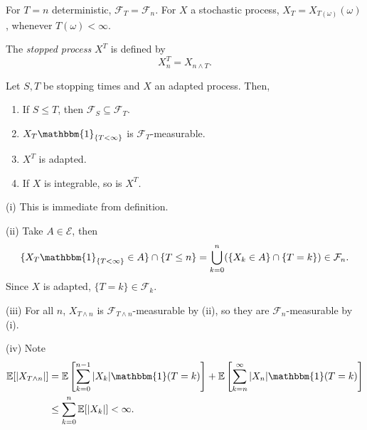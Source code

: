\documentclass[12pt]{article}
\begin{document}
For $T = n$ deterministic, $\mathcal{F}_T = \mathcal{F}_n$. For $X$ a stochastic process, $X_T = X_{T(\omega)}(\omega)$, whenever $T(\omega) < \infty$.

The \emph{stopped process} $X^T$ is defined by
\[
X^T_n = X_{ n \wedge T}.
\]

\begin{proposition}
	Let $S, T$ be stopping times and $X$ an adapted process. Then,
	\begin{enumerate}[\normalfont(i)]
		\item If $S \leq T$, then $\mathcal{F}_S \subseteq \mathcal{F}_T$.
		\item $X_T \mathbbm{1}_{\{T < \infty\}}$ is $\mathcal{F}_T$-measurable.
		\item $X^T$ is adapted.
		\item If $X$ is integrable, so is $X^T$.
	\end{enumerate}
\end{proposition}

\begin{proofbox}
	
	
	(i) This is immediate from definition.

	(ii) Take $A \in \mathcal{E}$, then
	\begin{align*}
		\{X_T \mathbbm{1}_{\{T < \infty\}} \in A \} \cap \{T \leq n\} = \bigcup_{k = 0}^n (\{X_k \in A\} \cap \{T = k\}) \in \mathcal{F}_n.
	\end{align*}
	Since $X$ is adapted, $\{T = k\} \in \mathcal{F}_k$.

	(iii) For all $n$, $X_{T \wedge n}$ is $\mathcal{F}_{T \wedge n}$-measurable by (ii), so they are $\mathcal{F}_n$-measurable by (i).

	(iv) Note
	\begin{align*}
		\mathbb{E}[|X_{T \wedge n}|] &= \mathbb{E}\left[ \sum_{k = 0}^{n-1} |X_k| \mathbbm{1}(T = k) \right] + \mathbb{E}\left[ \sum_{k = n}^\infty |X_n| \mathbbm{1}(T = k) \right] \\
					     &\leq \sum_{k = 0}^n \mathbb{E}[|X_k|] < \infty.
	\end{align*}
\end{proofbox}
\end{document}

